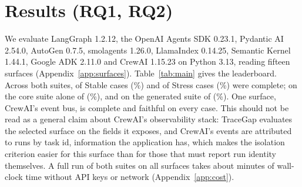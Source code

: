 \documentclass[10pt]{article}
\begin{document}
\section{Results (RQ1, RQ2)}
\label{sec:results}

We evaluate LangGraph 1.2.12, the OpenAI Agents SDK 0.23.1, Pydantic AI 2.54.0, AutoGen 0.7.5, smolagents 1.26.0, LlamaIndex 0.14.25, Semantic Kernel 1.44.1, Google ADK 2.11.0 and CrewAI 1.15.23 on Python 3.13, reading fifteen surfaces (Appendix~\ref{app:surfaces}). Table~\ref{tab:main} gives the leaderboard. Across both suites, \stableComplete{} of \stableCases{} Stable cases (\stablePct\%) and \stressComplete{} of \stressCases{} Stress cases (\stressPct\%) were complete; on the core suite alone \coreComplete{} of \coreCases{} (\corePct\%), and on the generated suite \genComplete{} of \genCases{} (\genPct\%). One surface, CrewAI's event bus, is complete and faithful on every case. This should not be read as a general claim about CrewAI's observability stack: TraceGap evaluates the selected surface on the fields it exposes, and CrewAI's events are attributed to runs by task id, information the application has, which makes the isolation criterion easier for this surface than for those that must report run identity themselves. A full run of both suites on all surfaces takes about \totalMinutes{} minutes of wall-clock time without API keys or network (Appendix~\ref{app:cost}).

\begin{table}[t]
\centering\small
\setlength{\tabcolsep}{3.6pt}
\caption{Leaderboard. Stable tier: 206 cases per surface from both suites and modes. Capability columns count complete Stable cases among the core scenarios for tool failures (S05--S06), cancellation (S17--S18), rejected calls (S08--S10) and nested agents (S22). Fail$\to$ok: failed or cancelled calls recorded as successful (both suites).}
\label{tab:main}
\end{table}
\end{document}
